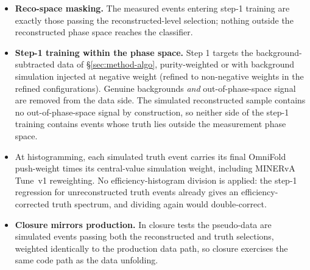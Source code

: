 \begin{itemize}[itemsep=2pt]
  \item \textbf{Reco-space masking.} The measured events entering step-1 training are exactly those passing the reconstructed-level selection; nothing outside the reconstructed phase space reaches the classifier.
  \item \textbf{Step-1 training within the phase space.} Step 1 targets the background-subtracted data of \S\ref{sec:method-algo}, purity-weighted or with background simulation injected at negative weight (refined to non-negative weights in the refined configurations). Genuine backgrounds \emph{and} out-of-phase-space signal are removed from the data side. The simulated reconstructed sample contains no out-of-phase-space signal by construction, so neither side of the step-1 training contains events whose truth lies outside the measurement phase space.
  \item At histogramming, each simulated truth event carries its final OmniFold push-weight times its central-value simulation weight, including MINERvA Tune~v1 reweighting. No efficiency-histogram division is applied: the step-1 regression for unreconstructed truth events already gives an efficiency-corrected truth spectrum, and dividing again would double-correct.
  \item \textbf{Closure mirrors production.} In closure tests the pseudo-data are simulated events passing both the reconstructed and truth selections, weighted identically to the production data path, so closure exercises the same code path as the data unfolding.
\end{itemize}

